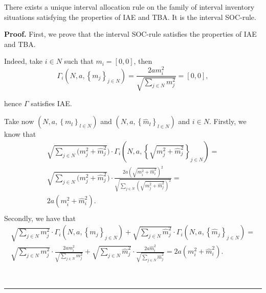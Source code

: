 \documentclass[10pt,a4paper]{amsart}
\newenvironment{proof}[1][Proof]{\noindent\textbf{#1.} }{\ \rule{0.5em}{0.5em}}
\begin{document}
\begin{thm}
\label{th.1.}  There exists a unique interval allocation rule on the family of interval inventory situations satisfying the properties of IAE and TBA. It is the interval SOC-rule.
\end{thm}

\begin{proof}
First, we prove that the interval SOC-rule satisfies the properties of IAE and TBA. 





Indeed, take $i\in N$ such that $m_{i}=\left[ 0,0\right]$, then 
\begin{equation*}
\Gamma_i (N,a,\left\{ m_{j}\right\} _{j\in
N})=\frac{2am_{i}^{2}}{\sqrt{\sum_{j\in N}m_{j}^{2}}}=\left[ 0,0\right],
\end{equation*}

hence $\Gamma$ satisfies IAE. 

Take now $(N,a,\left\{ m_{l}\right\}_{l\in N})$ and $(N,a,\left\{ \hat{m}_{l}\right\} _{l\in N})$ and $i\in N$. Firstly, we know that 
\begin{equation*}
\begin{split}
\sqrt{\sum_{j\in N}(m_j^2+\hat{m}_j^2})\cdot \Gamma_i (N,a,\left\{ \sqrt{m^2_{j}+\hat{m}^2_{j}}\right\} _{j\in
N})=\\
\sqrt{\sum_{j\in N}(m_j^2+\hat{m}_j^2})\cdot\frac{2a\left(\sqrt{m^2_{i}+\hat{m}^2_{i}}\right)^{2}}{\sqrt{\sum_{j\in N}\left(\sqrt{m^2_{j}+\hat{m}^2_{j}}\right)^{2}}}=\\
2a\left(m^2_{i}+\hat{m}^2_{i}\right).\\
\end{split}
\end{equation*}%
Secondly, we have that  
\begin{equation*}
\begin{split}
\sqrt{\sum_{j\in N}m_j^2}\cdot \Gamma_i
(N,a,\left\{ m_{j}\right\} _{j\in
N})+\sqrt{\sum_{j\in N}\hat{m}_j^2}\cdot \Gamma_i (N,a,\left\{ \hat{m}_{j}\right\} _{j\in
N})=\\
\sqrt{\sum_{j\in N}m_j^2}\cdot \frac{2am_i^2}{\sqrt{\sum_{j\in N}m_{j}^{2}}}+\sqrt{\sum_{j\in N}\hat{m}_j^2}\cdot \frac{2a\hat{m}_i^2}{\sqrt{\sum_{j\in N}\hat{m}_{j}^{2}}}=
2a\left(m^2_{i}+\hat{m}^2_{i}\right).
\end{split}
\end{equation*}%


\end{proof}
\end{document}
